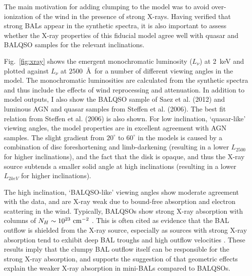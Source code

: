 The main motivation for adding clumping to the model was
to avoid over-ionization of the wind in the presence of strong X-rays. 
Having verified that strong BALs appear in the synthetic spectra,
it is also important to assess whether the X-ray properties of this
fiducial model agree well with quasar and BALQSO samples for the relevant
inclinations.

Fig.~\ref{fig:xray} shows the emergent
monochromatic luminosity ($L_\nu$) at 2~keV and 
plotted against $L_\nu$ at $2500$~\AA\ 
for a number of different viewing angles in the model.
The monochromatic luminosities are calculated from the synthetic spectra and thus include
the effects of wind reprocessing and attenuation. In addition to model outputs,
I also show the BALQSO sample of Saez et al. (2012) and luminous AGN and quasar
samples from Steffen et al. (2006). The best fit relation from Steffen et al. (2006) 
is also shown. For low inclination, `quasar-like' viewing angles,
the model properties are in excellent agreement with AGN samples. The slight gradient from $20^\circ$ to
$60^\circ$ in the models is caused by a combination of disc foreshortening and limb-darkening 
(resulting in a lower $L_{2500}$ for higher inclinations), and the fact that the disk 
is opaque, and thus the X-ray source subtends a smaller solid angle at high inclinations
(resulting in a lower $L_{2keV}$ for higher inclinations). 


The high inclination, `BALQSO-like' viewing angles show moderate agreement with the data,
and are X-ray weak due to bound-free absorption and electron scattering in the wind.
Typically, BALQSOs show strong X-ray absorption with columns 
of $N_H\sim10^{23}~\rm{cm^{-2}}$ 
\citep{green1996,mathur2000,green2001,grupemathur2003}.
This is often cited as evidence that the BAL outflow is shielded from
the X-ray source, especially as sources with strong X-ray absorption tend
to exhibit deep BAL troughs and high outflow velocities 
\citep{brandt2000,laorbrandt2002,gallagher2006}.
These results imply that the clumpy BAL outflow
itself can be responsible for the strong X-ray absorption, 
and supports the suggestion of \cite{hamann2013} that 
geometric effects explain the weaker X-ray absorption in mini-BALs 
compared to BALQSOs.

